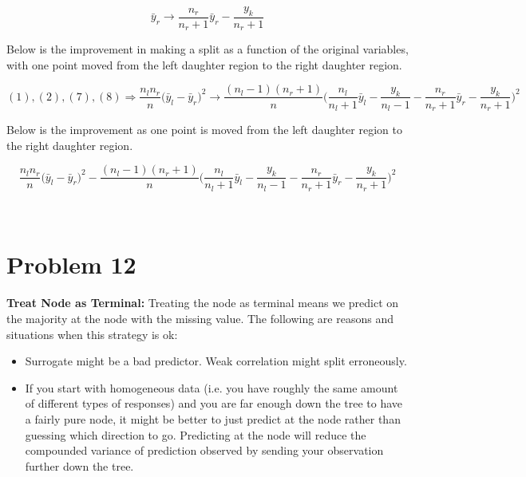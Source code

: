 \documentclass[11pt]{article}
\begin{document}
\begin{equation}
\bar{y}_r \rightarrow \frac{n_r}{n_r+1}\bar{y}_r - \frac{y_k}{n_r+1}
\end{equation}

Below is the improvement in making a split as a function of the original 
variables, with one point moved from the left daughter region to the right 
daughter region. 

$$(1), (2), (7), (8) \Rightarrow \frac{n_ln_r}{n} \big(\bar{y}_l - 
\bar{y}_r\big)^2 \rightarrow \frac{(n_l-1)(n_r+1)}{n}
\bigg(\frac{n_l}{n_l+1}\bar{y}_l - \frac{y_k}{n_l-1} - 
\frac{n_r}{n_r+1}\bar{y}_r - \frac{y_k}{n_r + 1}\bigg)^2$$

Below is the improvement as one point is moved from the left daughter region to 
the right daughter region. 

$$\frac{n_ln_r}{n} \big(\bar{y}_l - \bar{y}_r\big)^2 - 
\frac{(n_l-1)(n_r+1)}{n}\bigg(\frac{n_l}{n_l+1}\bar{y}_l - \frac{y_k}{n_l-1} - 
\frac{n_r}{n_r+1}\bar{y}_r - \frac{y_k}{n_r + 1}\bigg)^2$$
\newpage
\begin{center}
\ \\
\end{center}

\section*{Problem 12}

\vspace{5 mm}
\noindent
{\bf Treat Node as Terminal:} Treating the node as terminal means we predict on 
the majority at the node with the missing value. The following are reasons and 
situations when this strategy is ok:

\begin{itemize}
\item Surrogate might be a bad predictor. Weak correlation might split 
erroneously.
\item If you start with homogeneous data (i.e. you have roughly the same amount 
of different types of responses) and you are far enough down the tree to have a 
fairly pure node, it might be better to just predict at the node rather than 
guessing which direction to go. Predicting at the node will reduce the 
compounded variance of prediction observed by sending your observation further 
down the tree.
\end{itemize}
\end{document}
